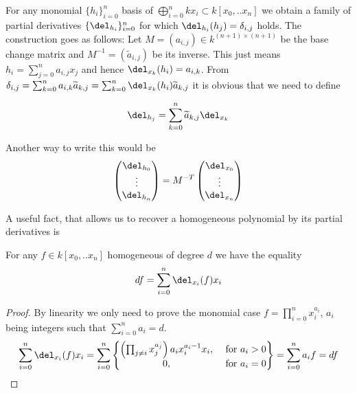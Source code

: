 \begin{example}
For any monomial $\{ h_i\}_{i=0}^n$ basis of $\bigoplus_{i=0}^n kx_i \subset k[x_0,..x_n]$ we obtain a family of partial derivatives $\{ \del_{h_i} \}_{i=0}^n$ for which $\del_{h_i}(h_j) = \delta_{i,j}$ holds. The construction goes as follows: Let $M = (a_{i,j})  \in k^{(n+1)\times(n+1)}$ be the base change matrix and $M^{-1} = (\widetilde a_{i,j})$ be its inverse.
This just means $h_i = \sum_{j=0}^n a_{i,j} x_j$ and hence $\del_{x_k}(h_i) = a_{i,k}$.
From $\delta_{i,j} = \sum_{k=0}^n a_{i,k}\widetilde a_{k,j}
= \sum_{k=0}^n \del_{x_k}(h_i) \widetilde a_{k,j}$ it is obvious that we need to define

\begin{equation}
\del_{h_j} = \sum_{k=0}^n \widetilde a_{k,j} \del_{x_k}
\end{equation}

Another way to write this would be
\begin{equation}
\begin{pmatrix} \del_{h_0} \\ \vdots \\ \del_{h_n} \end{pmatrix}
= M^{-T}
\begin{pmatrix} \del_{x_0} \\ \vdots \\ \del_{x_n} \end{pmatrix}
\end{equation}
\end{example}

A useful fact, that allows us to recover a homogeneous polynomial by its partial derivatives is

\begin{proposition}
For any $f \in k[x_0,..x_n]$ homogeneous of degree $d$ we have the equality
\[ df = \sum_{i=0}^n \del_{x_i}(f)x_i \]
\end{proposition}
\begin{proof}
By linearity we only need to prove the monomial case $f = \prod_{i=0}^n x_i^{a_i}$, $a_i$ being integers such that $\sum_{i=0}^n a_i = d$.
\begin{equation}
\sum_{i=0}^n \del_{x_i}(f)x_i
= \sum_{i=0}^n \begin{Bmatrix} \left(\prod_{j\neq i} x_j^{a_j}\right) a_i x_i^{a_i-1} x_i, & \text{ for } a_i > 0
\\ 0, &\text{ for } a_i = 0 \end{Bmatrix}
= \sum_{i=0}^n a_i f = df
\end{equation}
\end{proof}

